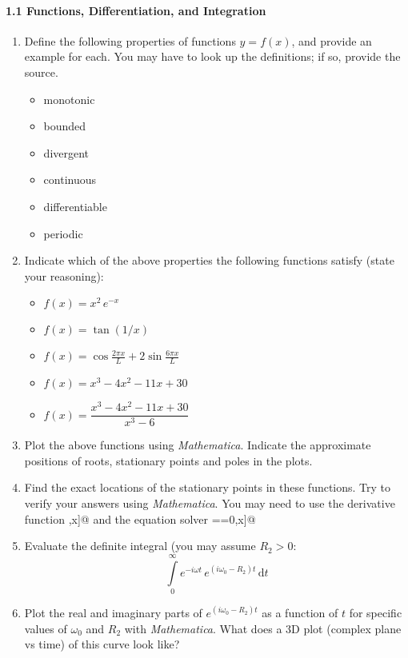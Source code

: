 \documentclass{chem6155problemset}
\begin{document}
\paragraph{1.1 Functions, Differentiation, and Integration}
\begin{enumerate}
 	\item Define the following properties of functions $y=f(x)$, and provide an example for each. You
	may have to look up the definitions; if so, provide the source.
	  \begin{itemize}
	  	\item monotonic
		\item bounded
		\item divergent
		\item continuous
		\item differentiable
		\item periodic
	  \end{itemize}

	 \item Indicate which of the above properties the following functions satisfy (state
	 your reasoning):
	 	\begin{itemize}
			\item $f(x)=x^2\,e^{-x}$
			\item $f(x)=\tan(1/x)$
			\item $f(x)=\cos\frac{2\pi x}{L} + 2 \sin\frac{6\pi x}{L}$
			\item $f(x) = x^3-4x^2-11x+30$
			\item $f(x) = \dfrac{x^3-4x^2-11x+30}{x^3-6}$
		\end{itemize}

	\item Plot the above functions using \emph{Mathematica}. Indicate the approximate
	positions of roots, stationary points and poles in the plots.

	\item Find the exact locations of the stationary points in these functions.
	Try to verify your answers using \emph{Mathematica}. You may need to use
	the derivative function \verb@D[f[x],x]@ and the equation solver \verb@Solve[f[x]==0,x]@


	\item Evaluate the definite integral (you may assume $R_2>0$:
		\[\displaystyle\int\limits_{0}^{\infty} e^{-i\omega t} \, e^{(i\omega_0-R_2) t}\,\mathrm{d}t\]



	 \item Plot the real and imaginary parts of  $e^{(i\omega_0-R_2) t}$
   as a function of $t$ for specific values of $\omega_0$ and $R_2$
   with \emph{Mathematica}. What does a 3D plot (complex plane vs time)
   of this curve look like?



\end{enumerate}
\end{document}
